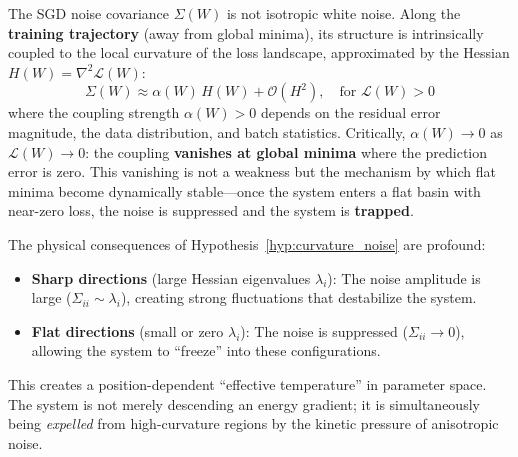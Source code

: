 \documentclass[
  journal=largetwo,
  simfonts=false,
  year=2025,
  volume=37,
]{cup-journal}
\begin{document}
\begin{hypothesis}\label{hyp:curvature_noise}
The SGD noise covariance $\Sigma(W)$ is not isotropic white noise. Along the \textbf{training trajectory} (away from global minima), its structure is intrinsically coupled to the local curvature of the loss landscape, approximated by the Hessian $H(W) = \nabla^2 \mathcal{L}(W)$:
\begin{equation}\label{eq:noise_hessian_coupling}
    \Sigma(W) \approx \alpha(W) \, H(W) + \mathcal{O}(H^2), \quad \text{for } \mathcal{L}(W) > 0
\end{equation}
where the coupling strength $\alpha(W) > 0$ depends on the residual error magnitude, the data distribution, and batch statistics. Critically, $\alpha(W) \to 0$ as $\mathcal{L}(W) \to 0$: the coupling \textbf{vanishes at global minima} where the prediction error is zero. This vanishing is not a weakness but the mechanism by which flat minima become dynamically stable---once the system enters a flat basin with near-zero loss, the noise is suppressed and the system is \textbf{trapped}.
\end{hypothesis}



The physical consequences of Hypothesis~\ref{hyp:curvature_noise} are profound:

\begin{itemize}
    \item \textbf{Sharp directions} (large Hessian eigenvalues $\lambda_i$): The noise amplitude is large ($\Sigma_{ii} \sim \lambda_i$), creating strong fluctuations that destabilize the system.
    \item \textbf{Flat directions} (small or zero $\lambda_i$): The noise is suppressed ($\Sigma_{ii} \to 0$), allowing the system to ``freeze'' into these configurations.
\end{itemize}

This creates a position-dependent ``effective temperature'' in parameter space. The system is not merely descending an energy gradient; it is simultaneously being \textit{expelled} from high-curvature regions by the kinetic pressure of anisotropic noise.
\end{document}
